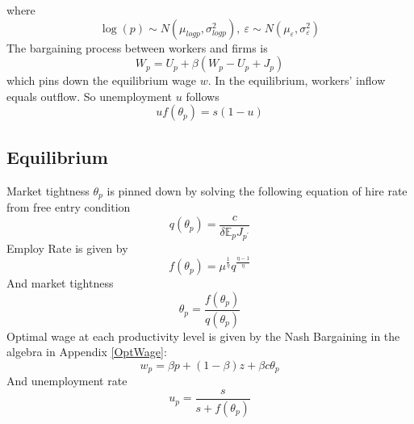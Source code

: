 \documentclass[10pt]{article} %
\begin{document}
        where \[\log(p) \sim N(\mu_{logp}, \sigma^2_{logp}),\ 
        \varepsilon \sim N(\mu_\varepsilon,\sigma^2_\varepsilon)\]
    The bargaining process between workers and firms is 
    \begin{equation}
        W_p = U_p + \beta (W_p - U_p + J_p)
    \end{equation} which pins down the equilibrium wage \(w\).\newline
    In the equilibrium, workers' inflow equals outflow. So unemployment \(u\) follows
    \[u f(\theta_p) = s(1-u)\]
    
    \subsection{Equilibrium}
    Market tightness \(\theta_p\) is pinned down by solving the following equation of hire rate from free entry condition 
    \begin{equation}\label{HireRate}
    q(\theta_p) = \frac{c}{\delta \mathbb{E}_p J_{p^\prime}}\end{equation}
    Employ Rate is given by \begin{equation}\label{EmployRate}
    f(\theta_p) = \mu^\frac{1}{\eta} q^\frac{\eta-1}{\eta}\end{equation}
    And market tightness \begin{equation}\label{MarketTightness}
    \theta_p = \frac{f(\theta_p)}{q(\theta_p)}\end{equation}
    Optimal wage at each productivity level is given by the Nash Bargaining in the algebra in Appendix \ref{OptWage}: 
    \begin{equation}\label{OptimalWage}
        w_p = \beta p + (1-\beta)z + \beta c \theta_p\end{equation}
    And unemployment rate \begin{equation}\label{UnemployRate}
        u_p = \frac{s}{s + f(\theta_p)}\end{equation}
    
\end{document}
